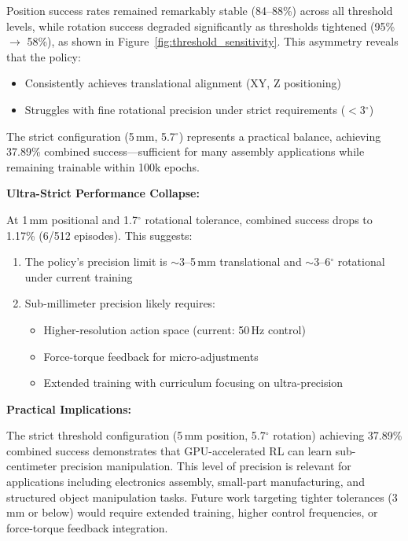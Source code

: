 \documentclass[12pt,a4paper,oneside]{report}
\begin{document}
Position success rates remained remarkably stable (84--88\%) across all threshold levels, while rotation success degraded significantly as thresholds tightened (95\% $\rightarrow$ 58\%), as shown in Figure~\ref{fig:threshold_sensitivity}. This asymmetry reveals that the policy:
\begin{itemize}
    \item Consistently achieves translational alignment (XY, Z positioning)
    \item Struggles with fine rotational precision under strict requirements ($<$3$^\circ$)
\end{itemize}

The strict configuration (5\,mm, 5.7$^\circ$) represents a practical balance, achieving 37.89\% combined success---sufficient for many assembly applications while remaining trainable within 100k epochs.

\textbf{Ultra-Strict Performance Collapse:}

At 1\,mm positional and 1.7$^\circ$ rotational tolerance, combined success drops to 1.17\% (6/512 episodes). This suggests:
\begin{enumerate}
    \item The policy's precision limit is $\sim$3--5\,mm translational and $\sim$3--6$^\circ$ rotational under current training
    \item Sub-millimeter precision likely requires:
    \begin{itemize}
        \item Higher-resolution action space (current: 50\,Hz control)
        \item Force-torque feedback for micro-adjustments
        \item Extended training with curriculum focusing on ultra-precision
    \end{itemize}
\end{enumerate}

\textbf{Practical Implications:}

The strict threshold configuration (5\,mm position, 5.7$^\circ$ rotation) achieving 37.89\% combined success demonstrates that GPU-accelerated RL can learn sub-centimeter precision manipulation. This level of precision is relevant for applications including electronics assembly, small-part manufacturing, and structured object manipulation tasks. Future work targeting tighter tolerances (3\,mm or below) would require extended training, higher control frequencies, or force-torque feedback integration.
\end{document}
